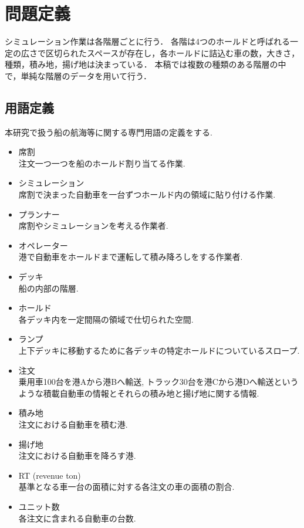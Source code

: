 \chapter{問題定義}\label{definition}

シミュレーション作業は各階層ごとに行う．
各階は4つのホールドと呼ばれる一定の広さで区切られたスペースが存在し，各ホールドに詰込む車の数，大きさ，種類，積み地，揚げ地は決まっている．
本稿では複数の種類のある階層の中で，単純な階層のデータを用いて行う．



\section{用語定義}
本研究で扱う船の航海等に関する専門用語の定義をする.

\begin{itemize}
    \item 席割 \\
    注文一つ一つを船のホールド割り当てる作業.

    \item シミュレーション \\
    席割で決まった自動車を一台ずつホールド内の領域に貼り付ける作業.

    \item  プランナー \\
    席割やシミュレーションを考える作業者.

    \item  オペレーター\\
    港で自動車をホールドまで運転して積み降ろしをする作業者.

    \item デッキ \\
    船の内部の階層.

    \item ホールド \\
    各デッキ内を一定間隔の領域で仕切られた空間.

    \item ランプ \\
    上下デッキに移動するために各デッキの特定ホールドについているスロープ.

    \item 注文 \\
    乗用車100台を港Aから港Bへ輸送, トラック30台を港Cから港Dへ輸送というような積載自動車の情報とそれらの積み地と揚げ地に関する情報. 

    \item 積み地 \\
    注文における自動車を積む港.

    \item 揚げ地 \\
    注文における自動車を降ろす港.

    \item  RT (revenue ton) \\
    基準となる車一台の面積に対する各注文の車の面積の割合. 

    \item ユニット数 \\
    各注文に含まれる自動車の台数.
\end{itemize}


